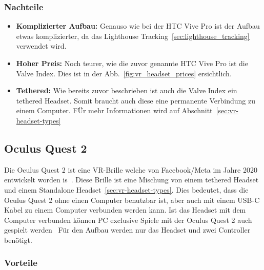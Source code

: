 \subsubsection{Nachteile}

\begin{itemize}
    \item \textbf{Komplizierter Aufbau:} Genauso wie bei der HTC Vive Pro ist der Aufbau etwas komplizierter, da das Lighthouse Tracking~\ref{sec:lighthouse_tracking} verwendet wird.
    \item \textbf{Hoher Preis:} Noch teurer, wie die zuvor genannte HTC Vive Pro ist die Valve Index.
    Dies ist in der Abb.~\ref{fig:vr_headset_prices} ersichtlich.
    \item \textbf{Tethered:} Wie bereits zuvor beschrieben ist auch die Valve Index ein tethered Headset.
    Somit braucht auch diese eine permanente Verbindung zu einem Computer.
    FÜr mehr Informationen wird auf Abschnitt~\ref{sec:vr-headset-types}
\end{itemize}

\subsection{Oculus Quest 2}\label{sec:oculus-quest-2}

Die Oculus Quest 2 ist eine VR-Brille welche von Facebook/Meta im Jahre 2020 entwickelt worden is~\cite{ADI_ROBERTSON_2020}.
Diese Brille ist eine Mischung von einem tethered Headset und einem Standalone Headset~\ref{sec:vr-headset-types}.
Dies bedeutet, dass die Oculus Quest 2 ohne einen Computer benutzbar ist, aber auch mit einem USB-C Kabel zu einem Computer verbunden werden kann.
Ist das Headset mit dem Computer verbunden können PC exclusive Spiele mit der Oculus Quest 2 auch gespielt werden~\cite{ADI_ROBERTSON_2020}
Für den Aufbau werden nur das Headset und zwei Controller benötigt.

\subsubsection{Vorteile}

